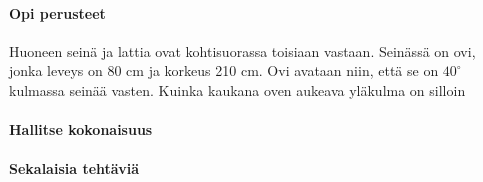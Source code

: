 \begin{tehtavasivu}

\paragraph*{Opi perusteet}

\begin{tehtava}
Huoneen seinä ja lattia ovat kohtisuorassa toisiaan vastaan. Seinässä on ovi, jonka leveys on 80 cm ja korkeus 210 cm. Ovi avataan niin, että se on $40^\circ$ kulmassa seinää vasten.
Kuinka kaukana oven aukeava yläkulma on silloin
\begin{vastaus}
\end{vastaus}
\end{tehtava}

\paragraph*{Hallitse kokonaisuus}

\paragraph*{Sekalaisia tehtäviä}

\end{tehtavasivu}
